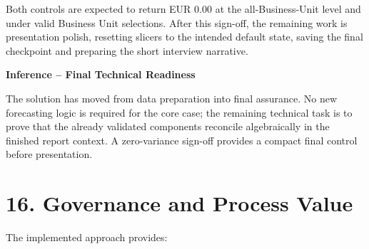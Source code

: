\documentclass[11pt,a4paper]{article}
\begin{document}
Both controls are expected to return EUR 0.00 at the all-Business-Unit level and under
valid Business Unit selections. After this sign-off, the remaining work is presentation
polish, resetting slicers to the intended default state, saving the final checkpoint and
preparing the short interview narrative.

\begin{inferencebox}
\textbf{Inference -- Final Technical Readiness}

The solution has moved from data preparation into final assurance. No new forecasting
logic is required for the core case; the remaining technical task is to prove that the
already validated components reconcile algebraically in the finished report context.
A zero-variance sign-off provides a compact final control before presentation.
\end{inferencebox}



\section{16. Governance and Process Value}

The implemented approach provides:
\end{document}
